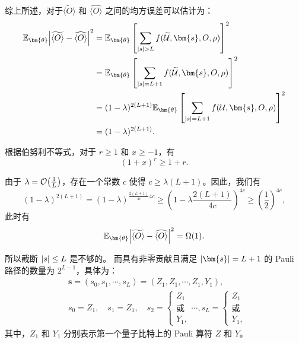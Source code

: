 综上所述，对于$\widetilde{\langle O \rangle}$ 和 $\widehat{\langle O \rangle}$ 之间的均方误差可以估计为： 
\begin{equation} 
    \begin{aligned} 
        \mathbb{E}_{\bm{\theta}}\abs{\widetilde{\langle O \rangle}-\widehat{\langle O \rangle}}^2 &=\mathbb{E}_{\bm{\theta}}\left[\sum_{\abs{s}> L}f(\widetilde{\mathcal{U}},\bm{s},O,\rho)\right]^2\\
         &=\mathbb{E}_{\bm{\theta}}\left[\sum_{\abs{s}=L+1}f(\widetilde{\mathcal{U}},\bm{s},O,\rho)\right]^2\\
        &= (1-\lambda)^{2(L+1)}\mathbb{E}_{\bm{\theta}} \left[\sum_{\abs{s}=L+1}{f}(\mathcal{U},\bm{s},O,\rho)\right]^2\\ 
        &=(1-\lambda)^{2(L+1)}.
    \end{aligned} 
\end{equation}

根据伯努利不等式，对于 $r\geq 1$ 和 $x\geq -1$，有 
\begin{equation} 
    (1+x)^r\geq 1+r. 
\end{equation}

由于 $\lambda=\order{\frac{1}{L}}$，存在一个常数 $c$ 使得 $c\geq \lambda (L+1)$。因此，我们有 \begin{equation} 
    (1-\lambda)^{2(L+1)}= (1-\lambda)^{\frac{2(L+1)}{4c} 4c} \geq \left(1-\lambda \frac{2(L+1)}{4c} \right)^{4c}\geq \left(\frac{1}{2}\right)^{4c}, 
\end{equation} 
此时有
\begin{equation} 
    \mathbb{E}_{\bm{\theta}}\abs{\widetilde{\langle O \rangle}-\widehat{\langle O \rangle}}^2 =\Omega(1). 
\end{equation}

所以截断 $\abs{s}\leq L$ 是不够的。 而具有非零贡献且满足 $\abs{\bm{s}}=L+1$ 的 Pauli 路径的数量为 $2^{L-1}$，具体为：
\begin{equation} 
    \begin{aligned}
        &\bm{s}=(s_0,s_1,\cdots,s_L)=(Z_1,Z_1,\cdots,Z_1,Y_1),\\
        &s_0=Z_1, \quad s_1=Z_1, \quad s_2=\begin{cases}
            Z_1 \\ \text{或}\\
            Y_1,
        \end{cases}
        \cdots, s_L=\begin{cases}
            Z_1 \\ \text{或} \\
            Y_1,
        \end{cases}
    \end{aligned}
\end{equation}
其中，$Z_1$ 和 $Y_1$ 分别表示第一个量子比特上的 Pauli 算符 $Z$ 和 $Y$。


